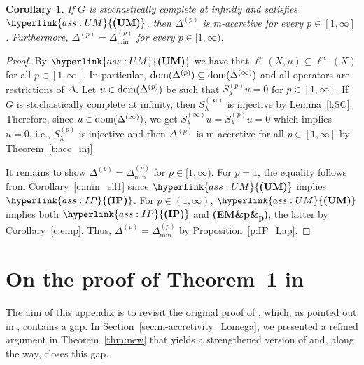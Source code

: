 \documentclass[letterpaper]{article}
\newtheorem{corollary}[lemma]{Corollary}
\theoremstyle{definition}
\theoremstyle{named}
\numberwithin{equation}{section}
\newcommand{\IP}{\hyperlink{ass:IP}{\textup{\textbf{(IP)}}}}
\newcommand{\UM}{\hyperlink{ass:UM}{\textup{\textbf{(UM)}}}}
\newcommand{\EM}[1][]{\hyperlink{ass:EM}{\textup{\textbf{(EM\ifx&#1&\else\textsubscript{#1}\fi)}}}}
\newcommand{\dom}{\textnormal{dom}} %
\newcommand{\deltam}{\Delta_{\min}}
\begin{document}
\begin{corollary}\label{c:sc_um}
If $G$ is stochastically complete at infinity 
and satisfies $\UM$, then $\Delta^{(p)}$ is m-accretive for every $p\in [1,\infty]$.
Furthermore, $\Delta^{(p)}=\deltam^{(p)}$ for every $p \in [1,\infty)$.
\end{corollary}
\begin{proof}

By $\UM$ we have that $\ell^{p}(X,\mu) \subseteq \ell^{\infty}(X)$ for all $p \in [1,\infty]$. 
In particular, $\dom(\Delta^{(p)})  \subseteq \dom(\Delta^{(\infty)}) $ and all operators
are restrictions of $\Delta$.
Let $u \in \dom(\Delta^{(p)})$ be such that $S^{(p)}_\lambda u = 0$ for $p \in [1,\infty]$. 
If $G$ is stochastically complete at infinity, then $S^{(\infty)}_\lambda$ is injective
by Lemma~\ref{l:SC}. Therefore, since $u \in \dom(\Delta^{(\infty)})$, we get $S^{(\infty)}_\lambda u = S^{(p)}_\lambda u = 0$ which implies $u=0$, i.e., $S^{(p)}_\lambda$ is injective and  then  $\Delta^{(p)}$ is m-accretive for all $p \in [1,\infty]$ by Theorem~\ref{t:acc_inj}.

It remains to show $\Delta^{(p)}=\deltam^{(p)}$ for $p \in [1,\infty)$. 
{ For $p=1$, the equality follows from Corollary~\ref{c:min_ell1}
since $\UM$ implies $\IP$. For $p\in(1,\infty)$, $\UM$ implies both $\IP$
and \EM[p], the latter by Corollary~\ref{c:emp}. Thus,
$\Delta^{(p)}=\deltam^{(p)}$ by Proposition~\ref{p:IP_Lap}.}
\end{proof}





\appendix



\section{\texorpdfstring{On the proof of Theorem~1 in \cite{bianchi2022generalized}}{On the proof of Theorem 1 in Bianchi et al.}}\label{sec:proof_Theo1}

The aim of this appendix is to revisit the original proof of \cite[Theorem 1]{bianchi2022generalized}, which, as pointed out in \cite{Ble24}, contains a gap. In Section~\ref{sec:m-accretivity_Lomega}, we presented a refined argument in Theorem~\ref{thm:new} that yields a strengthened version of \cite[Theorem 1]{bianchi2022generalized} and, along the way, closes this gap.
\end{document}
